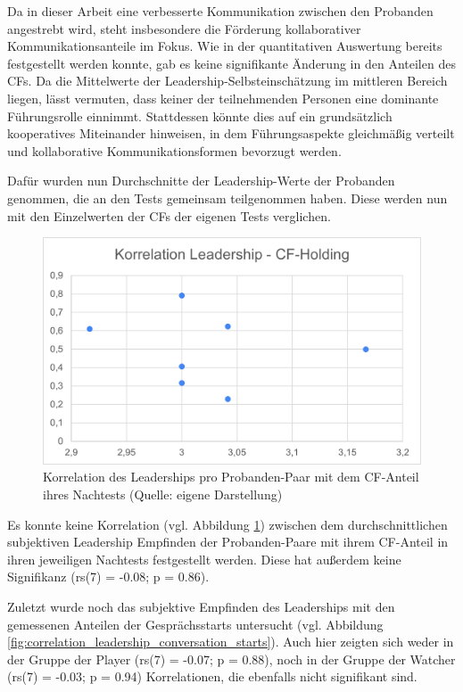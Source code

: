 Da in dieser Arbeit eine verbesserte Kommunikation zwischen den Probanden angestrebt wird, steht insbesondere die Förderung kollaborativer Kommunikationsanteile im Fokus. Wie in der quantitativen Auswertung bereits festgestellt werden konnte, gab es keine signifikante Änderung in den Anteilen des \ac{CF}s. Da die Mittelwerte der Leadership-Selbsteinschätzung im mittleren Bereich liegen, lässt vermuten, dass keiner der teilnehmenden Personen eine dominante Führungsrolle einnimmt. Stattdessen könnte dies auf ein grundsätzlich kooperatives Miteinander hinweisen, in dem Führungsaspekte gleichmäßig verteilt und kollaborative Kommunikationsformen bevorzugt werden.

Dafür wurden nun Durchschnitte der Leadership-Werte der Probanden genommen, die an den Tests gemeinsam teilgenommen haben. Diese werden nun mit den Einzelwerten der \ac{CF}s der eigenen Tests verglichen.

\begin{figure}[ht]
\centering
\includegraphics[width=1\linewidth]{content/pictures/korrelation_leadership_cfh.png}
\caption{Korrelation des Leaderships pro Probanden-Paar mit dem \ac{CF}-Anteil ihres Nachtests (Quelle: eigene Darstellung)}
\label{fig:correlation_leadership_cfh}
\end{figure}

Es konnte keine Korrelation (vgl. Abbildung \ref{fig:correlation_leadership_cfh}) zwischen dem durchschnittlichen subjektiven Leadership Empfinden der Probanden-Paare mit ihrem \ac{CF}-Anteil in ihren jeweiligen Nachtests festgestellt werden. Diese hat außerdem keine Signifikanz (rs(7) = -0.08; p = 0.86).

Zuletzt wurde noch das subjektive Empfinden des Leaderships mit den gemessenen Anteilen der Gesprächsstarts untersucht (vgl. Abbildung \ref{fig:correlation_leadership_conversation_starts}). Auch hier zeigten sich weder in der Gruppe der Player (rs(7) = -0.07; p = 0.88), noch in der Gruppe der Watcher (rs(7) = -0.03; p = 0.94) Korrelationen, die ebenfalls nicht signifikant sind. 

